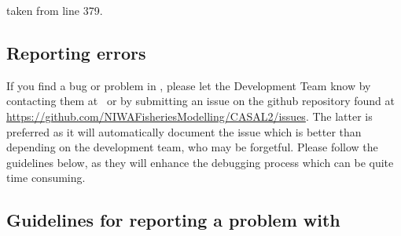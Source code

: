 
taken from line 379.


\subsection{Reporting errors\label{sec:reporting-errors}}

If you find a bug or problem in \CNAME , please let the Development Team know by contacting them at \email\ or by submitting an issue on the github repository found at \url{https://github.com/NIWAFisheriesModelling/CASAL2/issues}. The latter is preferred as it will automatically document the issue which is better than depending on the development team, who may be forgetful. Please follow the guidelines below, as they will enhance the debugging process which can be quite time consuming.

\subsection{Guidelines for reporting a problem with \CNAME\label{sec:error-guidelines}}

